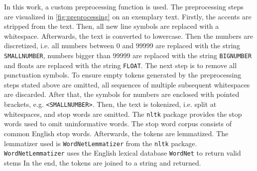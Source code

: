 In this work, a custom preprocessing function is used.
The preprocessing steps are visualized in \autoref{fig:preprocessing} on an exemplary text.
Firstly, the accents are stripped from the text.
Then, all new line symbols are replaced with a whitespace.
Afterwards, the text is converted to lowercase.
Then the numbers are discretized, i.e. all numbers between 0 and 99999 are replaced with the string \texttt{SMALLNUMBER}, 
numbers bigger than 99999 are replaced with the string \texttt{BIGNUMBER} and floats are replaced with the string \texttt{FLOAT}.
The next step is to remove all punctuation symbols.
To ensure empty tokens generated by the preprocessing steps stated above are omitted, 
all sequences of multiple subsequent whitespaces are discarded.
After that, the symbols for numbers are enclosed with pointed brackets, e.g. \texttt{<SMALLNUMBER>}.
Then, the text is tokenized, i.e. split at whitespaces, and stop words are omitted.
The \texttt{nltk} package provides the stop words used to omit uninformative words.
The stop word corpus consists of common English stop words.
Afterwards, the tokens are lemmatized.
The lemmatizer used is \texttt{WordNetLemmatizer} from the \texttt{nltk} package.
\texttt{WordNetLemmatizer} uses the English lexical database \texttt{WordNet} to return valid stems \cite{nltk-lemma-wordnet}
In the end, the tokens are joined to a string and returned.
